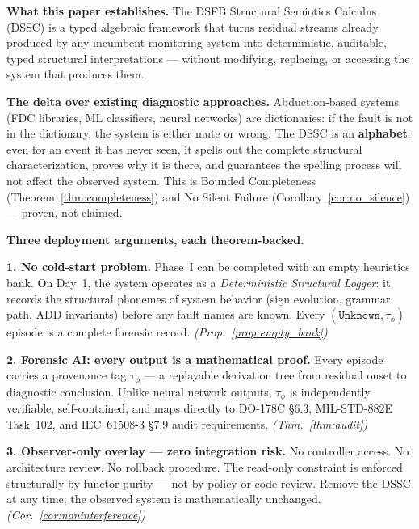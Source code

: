\documentclass[11pt,a4paper]{article}
\theoremstyle{plain}
\theoremstyle{definition}
\theoremstyle{remark}
\begin{document}
\begin{tcolorbox}[colback=blue!4, colframe=blue!55, boxrule=0.8pt, arc=4pt,
  left=8pt, right=8pt, top=7pt, bottom=7pt,
  title={\textbf{Executive Summary — Licensing Synopsis}},
  fonttitle=\normalsize\bfseries, coltitle=blue!10!black]

\textbf{What this paper establishes.}
The DSFB Structural Semiotics Calculus (DSSC) is a typed algebraic framework that turns
residual streams already produced by any incumbent monitoring system into deterministic,
auditable, typed structural interpretations — without modifying, replacing, or accessing
the system that produces them.

\medskip
\textbf{The delta over existing diagnostic approaches.}
Abduction-based systems (FDC libraries, ML classifiers, neural networks) are dictionaries:
if the fault is not in the dictionary, the system is either mute or wrong. The DSSC is an
\textbf{alphabet}: even for an event it has never seen, it spells out the complete structural
characterization, proves why it is there, and guarantees the spelling process will not
affect the observed system. This is Bounded Completeness (Theorem~\ref{thm:completeness})
and No Silent Failure (Corollary~\ref{cor:no_silence}) — proven, not claimed.

\medskip
\textbf{Three deployment arguments, each theorem-backed.}

\smallskip
\noindent\textbf{1. No cold-start problem.}
Phase~I can be completed with an empty heuristics bank. On Day~1, the system operates as
a \emph{Deterministic Structural Logger}: it records the structural phonemes of system
behavior (sign evolution, grammar path, ADD invariants) before any fault names are known.
Every $(\mathtt{Unknown}, \tau_\phi)$ episode is a complete forensic record.
\hfill\textit{(Prop.~\ref{prop:empty_bank})}

\smallskip
\noindent\textbf{2. Forensic AI: every output is a mathematical proof.}
Every episode carries a provenance tag $\tau_\phi$ — a replayable derivation tree from
residual onset to diagnostic conclusion. Unlike neural network outputs, $\tau_\phi$ is
independently verifiable, self-contained, and maps directly to DO-178C \S6.3,
MIL-STD-882E Task~102, and IEC~61508-3 \S7.9 audit requirements.
\hfill\textit{(Thm.~\ref{thm:audit})}

\smallskip
\noindent\textbf{3. Observer-only overlay — zero integration risk.}
No controller access. No architecture review. No rollback procedure. The read-only
constraint is enforced structurally by functor purity — not by policy or code review.
Remove the DSSC at any time; the observed system is mathematically unchanged.
\hfill\textit{(Cor.~\ref{cor:noninterference})}


\end{tcolorbox}
\end{document}
